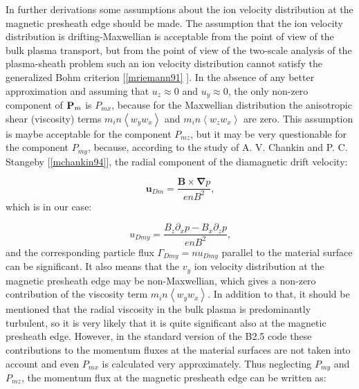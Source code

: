 \documentclass[11pt]{article}
\begin{document}
In further derivations some assumptions about the ion velocity distribution
at the magnetic presheath edge should be made. The assumption that the ion
velocity distribution is drifting-Maxwellian is acceptable from the point of
view of the bulk plasma transport, but from the point of view of the
two-scale analysis of the plasma-sheath problem such an ion velocity
distribution cannot satisfy the generalized Bohm criterion [\ref{mriemann91}%
]. In the absence of any better approximation and assuming that $%
u_{z}\approx0$ and $u_{y}\approx 0$, the only non-zero component of $\mathbf{%
P}_{m}$ is $P_{mx}$, because for the Maxwellian distribution the anisotropic
shear (viscosity) terms $m_{i}n\left\langle w_{y}w_{x}\right\rangle $ and $%
m_{i}n\left\langle w_{z}w_{x}\right\rangle $ are zero. This assumption is
maybe acceptable for the component $P_{mz}$, but it may be very questionable
for the component $P_{my}$, because, according to the study of A. V. Chankin
and P. C. Stangeby [\ref{mchankin94}], the radial component of the
diamagnetic drift velocity:

\begin{equation}
\mathbf{u}_{Dm}=\frac{\mathbf{B\times\nabla} p}{enB^{2}}\text{,} 
\label{129}
\end{equation}
which is in our case:

\begin{equation}
u_{Dmy}=\frac{B_{z}\partial_{x}p-B_{x}\partial_{z}p}{enB^{2}}\text{,} 
\label{130}
\end{equation}
and the corresponding particle flux $\Gamma_{Dmy}=nu_{Dmy}$ parallel to the
material surface can be significant. It also means that the $v_{y}$ ion
velocity distribution at the magnetic presheath edge may be non-Maxwellian,
which gives a non-zero contribution of the viscosity term $%
m_{i}n\left\langle w_{y}w_{x}\right\rangle $. In addition to that, it should
be mentioned that the radial viscosity in the bulk plasma is predominantly
turbulent, so it is very likely that it is quite significant also at the
magnetic presheath edge. However, in the standard version of the B2.5 code
these contributions to the momentum fluxes at the material surfaces are not
taken into account and even $P_{mx}$ is calculated very approximately. Thus
neglecting $P_{my}$ and $P_{mz}$, the momentum flux at the magnetic
presheath edge can be written as:
\end{document}
